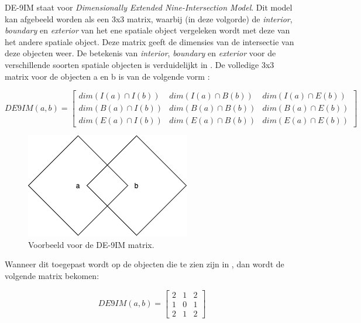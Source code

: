 DE-9IM staat voor \textit{Dimensionally Extended Nine-Intersection Model}. Dit model kan afgebeeld worden als een 3x3 matrix, waarbij (in deze volgorde) de \textit{interior}, \textit{boundary} en \textit{exterior} van het ene spatiale object vergeleken wordt met deze van het andere spatiale object. Deze matrix geeft de dimensies van de intersectie van deze objecten weer. De betekenis van \textit{interior}, \textit{boundary} en \textit{exterior} voor de verschillende soorten spatiale objecten is verduidelijkt in . De volledige 3x3 matrix voor de objecten a en b is van de volgende vorm \cite{shen2018classification}:

\begin{equation*}
    DE9IM(a,b) = 
    \begin{bmatrix}
    dim(I(a)\cap I(b)) & dim(I(a)\cap B(b)) & dim(I(a)\cap E(b))\\
    dim(B(a)\cap I(b)) & dim(B(a)\cap B(b)) & dim(B(a)\cap E(b))\\
    dim(E(a)\cap I(b)) & dim(E(a)\cap B(b)) & dim(E(a)\cap E(b))
    \end{bmatrix}
\end{equation*}

\begin{figure}[ht]
    \centering
    \includegraphics[width=0.5\linewidth]{images/de-9im_example.png}
    \caption{Voorbeeld voor de DE-9IM matrix.}
    \label{fig:de-9im_example}
\end{figure}

Wanneer dit toegepast wordt op de objecten die te zien zijn in , dan wordt de volgende matrix bekomen:

\begin{equation*}
    DE9IM(a,b) = 
    \begin{bmatrix}
    2 & 1 & 2\\
    1 & 0 & 1\\
    2 & 1 & 2
    \end{bmatrix}
\end{equation*}

